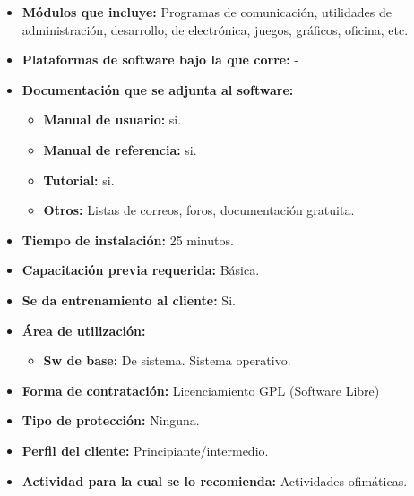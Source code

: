 \begin{itemize}
  \item \textbf{Módulos que incluye:} Programas de comunicación, utilidades de administración, desarrollo, de electrónica, juegos, gráficos, oficina, etc.
  \item \textbf{Plataformas de software bajo la que corre:} -

  \item \textbf{Documentación que se adjunta al software:}
    \begin{itemize}
      \item \textbf{Manual de usuario:} si.
      \item \textbf{Manual de referencia:} si.
      \item \textbf{Tutorial:} si.
      \item \textbf{Otros:} Listas de correos, foros, documentación gratuita.
    \end{itemize}

  \item \textbf{Tiempo de instalación:} 25 minutos.
  \item \textbf{Capacitación previa requerida:} Básica.
  \item \textbf{Se da entrenamiento al cliente:} Si.

  \item \textbf{Área de utilización:}
    \begin{itemize}
      \item \textbf{Sw de base:} De sistema. Sistema operativo.
    \end{itemize}

  \item \textbf{Forma de contratación:} Licenciamiento GPL (Software Libre)
  \item \textbf{Tipo de protección:} Ninguna.
  \item \textbf{Perfil del cliente:} Principiante/intermedio.
  \item \textbf{Actividad para la cual se lo recomienda:} Actividades ofimáticas.
\end{itemize}

